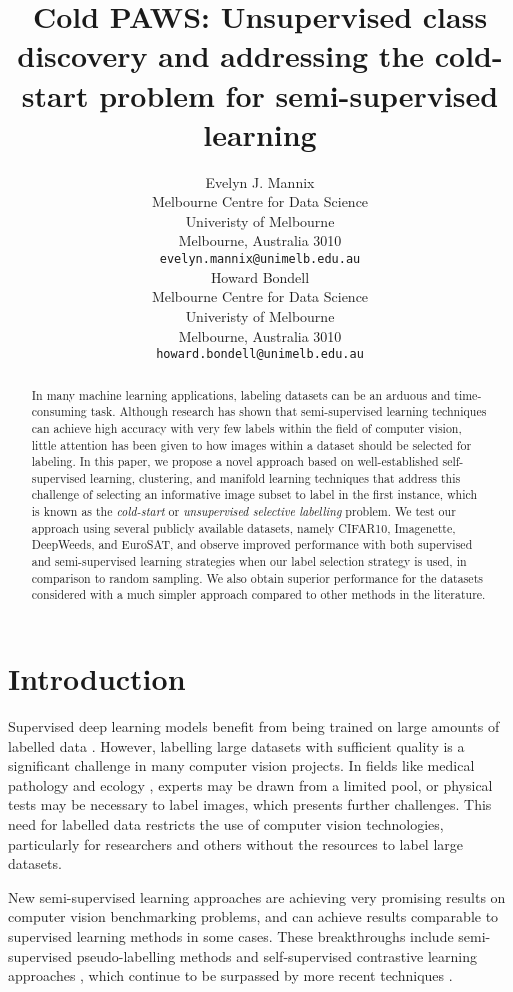 \documentclass{article}
\title{Cold PAWS: Unsupervised class discovery and addressing the cold-start problem for semi-supervised learning}
\author{Evelyn J. Mannix \\
  Melbourne Centre for Data Science\\
  Univeristy of Melbourne\\
  Melbourne, Australia 3010 \\
  \texttt{evelyn.mannix@unimelb.edu.au} \\
\And
  Howard Bondell \\
  Melbourne Centre for Data Science\\
  Univeristy of Melbourne\\
  Melbourne, Australia 3010 \\
  \texttt{howard.bondell@unimelb.edu.au} \\
}
\begin{document}
\maketitle


\begin{abstract}
In many machine learning applications, labeling datasets can be an arduous and time-consuming task. Although research has shown that semi-supervised learning techniques can achieve high accuracy with very few labels within the field of computer vision, little attention has been given to how images within a dataset should be selected for labeling. In this paper, we propose a novel approach based on well-established self-supervised learning, clustering, and manifold learning techniques that address this challenge of selecting an informative image subset to label in the first instance, which is known as the \textit{cold-start} or \textit{unsupervised selective labelling} problem. We test our approach using several publicly available datasets, namely CIFAR10, Imagenette, DeepWeeds, and EuroSAT, and observe improved performance with both supervised and semi-supervised learning strategies when our label selection strategy is used, in comparison to random sampling. We also obtain superior performance for the datasets considered with a much simpler approach compared to other methods in the literature.
\end{abstract}


\section{Introduction}

Supervised deep learning models benefit from being trained on large amounts of labelled data \citep{kolesnikov2020big}. However, labelling large datasets with sufficient quality is a significant challenge in many computer vision projects. In fields like medical pathology \citep{nguyen2020vindr, bustos2020padchest} and ecology \citep{schneider2020three}, experts may be drawn from a limited pool, or physical tests may be necessary to label images, which presents further challenges. This need for labelled data restricts the use of computer vision technologies, particularly for researchers and others without the resources to label large datasets.

New semi-supervised learning approaches are achieving very promising results on computer vision benchmarking problems, and can achieve results comparable to supervised learning methods in some cases. These breakthroughs include semi-supervised pseudo-labelling methods \citep{sohn2020fixmatch} and self-supervised contrastive learning approaches \citep{chen2020big}, which continue to be surpassed by more recent techniques \citep{wang2022freematch, assran2021semi}.
\end{document}

